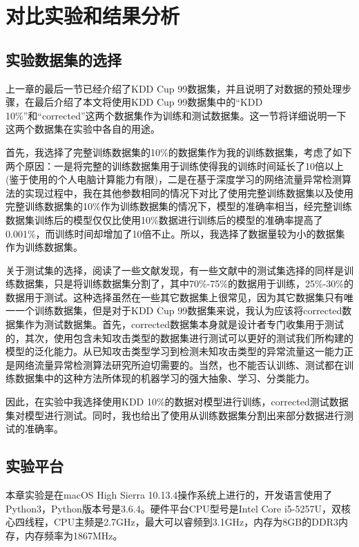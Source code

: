 
\chapter{对比实验和结果分析}

\section{实验数据集的选择}

上一章的最后一节已经介绍了KDD Cup 99数据集，并且说明了对数据的预处理步骤，在最后介绍了本文将使用KDD Cup 99数据集中的“KDD 10\%”和“corrected”这两个数据集作为训练和测试数据集。这一节将详细说明一下这两个数据集在实验中各自的用途。

首先，我选择了完整训练数据集的10\%的数据集作为我的训练数据集，考虑了如下两个原因：一是将完整的训练数据集用于训练使得我的训练时间延长了10倍以上(鉴于使用的个人电脑计算能力有限)，二是在基于深度学习的网络流量异常检测算法的实现过程中，我在其他参数相同的情况下对比了使用完整训练数据集以及使用完整训练数据集的10\%作为训练数据集的情况下，模型的准确率相当，经完整训练数据集训练后的模型仅仅比使用10\%数据进行训练后的模型的准确率提高了0.001\%，而训练时间却增加了10倍不止。所以，我选择了数据量较为小的数据集作为训练数据集。

关于测试集的选择，阅读了一些文献发现，有一些文献中的测试集选择的同样是训练数据集，只是将训练数据集分割了，其中70\%-75\%的数据用于训练，25\%-30\%的数据用于测试。这种选择虽然在一些其它数据集上很常见，因为其它数据集只有唯一一个训练数据集，但是对于KDD Cup 99数据集来说，我认为应该将corrected数据集作为测试数据集。首先，corrected数据集本身就是设计者专门收集用于测试的，其次，使用包含未知攻击类型的数据集进行测试可以更好的测试我们所构建的模型的泛化能力。从已知攻击类型学习到检测未知攻击类型的异常流量这一能力正是网络流量异常检测算法研究所迫切需要的。当然，也不能否认训练、测试都在训练数据集中的这种方法所体现的机器学习的强大抽象、学习、分类能力。

因此，在实验中我选择使用KDD 10\%的数据对模型进行训练，corrected测试数据集对模型进行测试。同时，我也给出了使用从训练数据集分割出来部分数据进行测试的准确率。

\section{实验平台}

本章实验是在macOS High Sierra 10.13.4操作系统上进行的，开发语言使用了Python3，Python版本号是3.6.4。硬件平台CPU型号是Intel Core i5-5257U，双核心四线程，CPU主频是2.7GHz，最大可以睿频到3.1GHz，内存为8GB的DDR3内存，内存频率为1867MHz。

